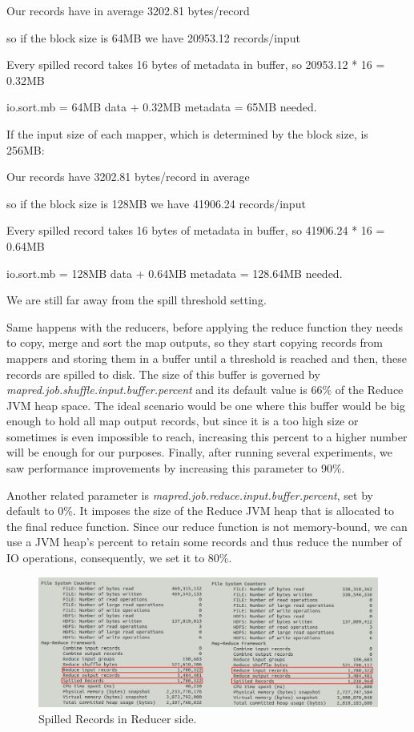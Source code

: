 \begin{itemize}
\centerline{Our records have in average 3202.81 bytes/record}
\centerline{so if the block size is 64MB we have 20953.12 records/input}
\centerline{Every spilled record takes 16 bytes of metadata in buffer, so 20953.12 * 16 = 0.32MB}
\centerline{io.sort.mb = 64MB data + 0.32MB metadata = 65MB needed.}

\bigskip

If the input size of each mapper, which is determined by the block size, is 256MB:

\bigskip
\centerline{Our records have 3202.81 bytes/record in average}
\centerline{so if the block size is 128MB we have 41906.24 records/input}      
\centerline{Every spilled record takes 16 bytes of metadata in buffer, so 41906.24 * 16 = 0.64MB}
\centerline{io.sort.mb = 128MB data + 0.64MB metadata = 128.64MB needed.}
\bigskip
\par
We are still far away from the spill threshold setting. 
\par
{}
\par
Same happens with the reducers, before applying the reduce function they needs to copy, merge and sort the map outputs, so they start copying records from mappers and storing them in a buffer until a threshold is reached and then, these records are spilled to disk. The size of this buffer is governed by \textit{mapred.job.shuffle.input.buffer.percent} and its default value is 66\% of the Reduce JVM heap space. The ideal scenario would be one where this buffer would be big enough to hold all map output records, but since it is a too high size or sometimes is even impossible to reach, increasing this percent to a higher number will be enough for our purposes. Finally, after running several experiments, we saw performance improvements by increasing this parameter to 90\%.
\par 
Another related parameter is \textit{mapred.job.reduce.input.buffer.percent}, set by default to 0\%. It imposes the size of the Reduce JVM heap that is allocated to the final reduce function. Since our reduce function is not memory-bound, we can use a JVM heap's percent to retain some records and thus reduce the number of IO operations, consequently, we set it to 80\%.


\begin{figure}[htb]
\centering
\includegraphics[width=1\textwidth]{./images/spilledReducerRecords.png}
\caption{Spilled Records in Reducer side.} \label{fig:spilledReducerRecords}
\end{figure}


\end{itemize}

